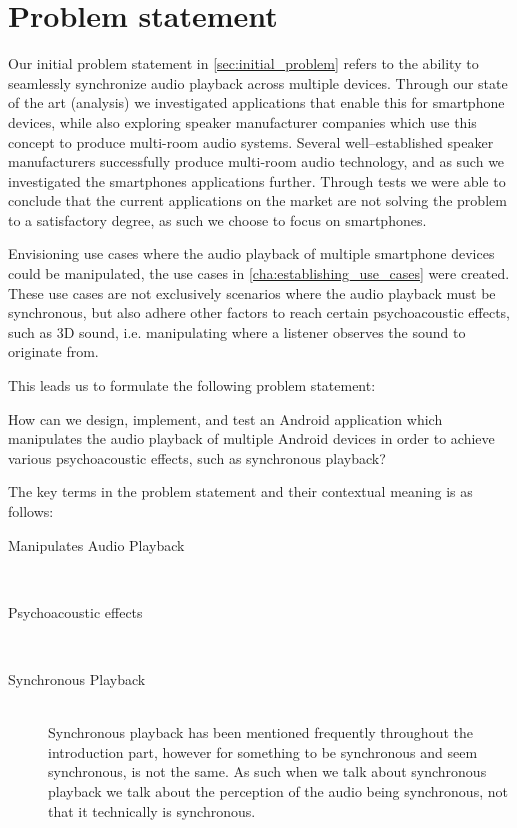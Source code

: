 \chapter{Problem statement}
Our initial problem statement in \cref{sec:initial_problem} refers to the ability to seamlessly synchronize audio playback across multiple devices.
Through our state of the art (analysis) we investigated applications that enable this for smartphone devices, while also exploring speaker manufacturer companies which use this concept to produce multi-room audio systems.
Several well--established speaker manufacturers successfully produce multi-room audio technology, and as such we investigated the smartphones applications further.
Through tests we were able to conclude that the current applications on the market are not solving the problem to a satisfactory degree, as such we choose to focus on smartphones.

Envisioning use cases where the audio playback of multiple smartphone devices could be manipulated, the use cases in \cref{cha:establishing_use_cases} were created.
These use cases are not exclusively scenarios where the audio playback must be synchronous, but also adhere other factors to reach certain psychoacoustic effects, such as 3D sound, i.e. manipulating where a listener observes the sound to originate from.

This leads us to formulate the following problem statement:

\begin{problemstatement}
    How can we design, implement, and test an Android application which manipulates the audio playback of multiple Android devices in order to achieve various psychoacoustic effects, such as synchronous playback?
\end{problemstatement}

The key terms in the problem statement and their contextual meaning is as follows:

\begin{description}
    \item [Manipulates Audio Playback] \hfill \\

    \item [Psychoacoustic effects] \hfill \\
    \item [Synchronous Playback] \hfill \\
        Synchronous playback has been mentioned frequently throughout the introduction part, however for something to be synchronous and seem synchronous, is not the same.
        As such when we talk about synchronous playback we talk about the perception of the audio being synchronous, not that it technically is synchronous.
\end{description}
